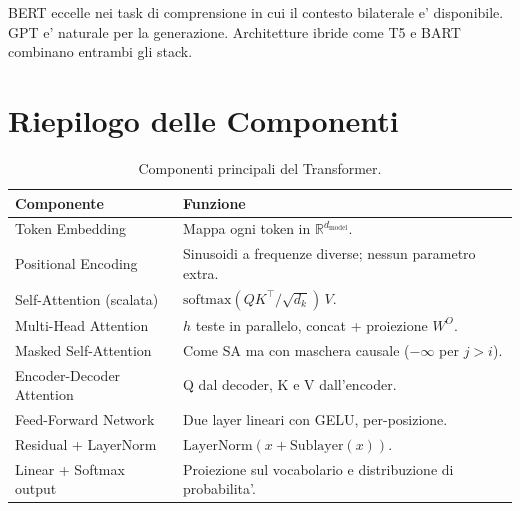 BERT eccelle nei task di comprensione in cui il contesto bilaterale
e' disponibile. GPT e' naturale per la generazione. Architetture
ibride come T5 e BART combinano entrambi gli stack.

\section{Riepilogo delle Componenti}
\label{sec:summary}

\begin{table}[H]
  \centering
  \caption{Componenti principali del Transformer.}
  \label{tab:components}
  \small
  \begin{tabular}{p{4.2cm}p{9cm}}
    \toprule
    \textbf{Componente} & \textbf{Funzione} \\
    \midrule
    Token Embedding
      & Mappa ogni token in $\mathbb{R}^{d_{\text{model}}}$. \\[2pt]
    Positional Encoding
      & Sinusoidi a frequenze diverse; nessun parametro extra. \\[2pt]
    Self-Attention (scalata)
      & $\mathrm{softmax}(QK^\top/\sqrt{d_k})\,V$. \\[2pt]
    Multi-Head Attention
      & $h$ teste in parallelo, concat + proiezione $W^O$. \\[2pt]
    Masked Self-Attention
      & Come SA ma con maschera causale ($-\infty$ per $j > i$). \\[2pt]
    Encoder-Decoder Attention
      & Q dal decoder, K e V dall'encoder. \\[2pt]
    Feed-Forward Network
      & Due layer lineari con GELU, per-posizione. \\[2pt]
    Residual + LayerNorm
      & $\mathrm{LayerNorm}(x + \mathrm{Sublayer}(x))$. \\[2pt]
    Linear + Softmax output
      & Proiezione sul vocabolario e distribuzione di probabilita'. \\
    \bottomrule
  \end{tabular}
\end{table}
